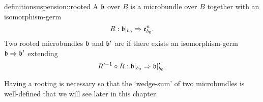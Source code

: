 \begin{mystatement}{definition}{suspension::rooted}
    A  $\bb$ over $B$ is a microbundle
    over $B$ together with an isomorphism-germ
    \[ \germdef{R}{\bbb}{\be{b_0}}. \]
    Two rooted microbundles $\bb$ and $\bb'$ are 
    if there exists an isomorphism-germ $\germ{\bb}{\bb'}$ extending
    \[ \germdef{\inv{R'} \circ R}{\bbb}{\bbb'}. \]
\end{mystatement}

\begin{myparagraph}
    Having a rooting is necessary
    so that the `wedge-sum' of two microbundles is well-defined
    that we will see later in this chapter.
\end{myparagraph}